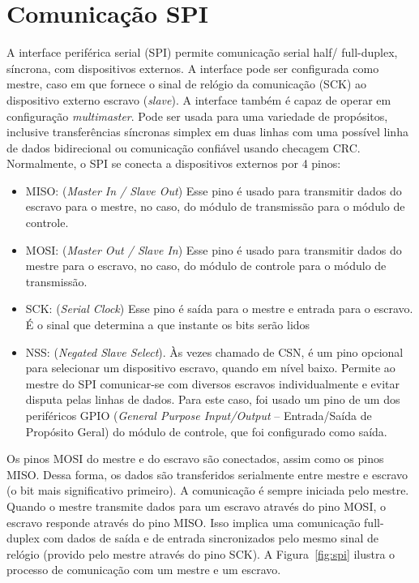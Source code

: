 \chapter{Comunicação SPI}\label{cap:com_spi}

A interface periférica serial (SPI) permite comunicação serial half/ full-duplex, síncrona, com dispositivos externos. A interface pode ser configurada como mestre, caso em que fornece o sinal de relógio da comunicação (SCK) ao dispositivo externo escravo (\textit{slave}). A 
interface também é capaz de operar em configuração \textit{multimaster}.
Pode ser usada para uma variedade de propósitos, inclusive transferências síncronas simplex em duas linhas com uma possível linha de dados bidirecional ou comunicação confiável usando checagem CRC.
Normalmente, o SPI se conecta a dispositivos externos por 4 pinos:
\begin{itemize}
\item MISO: (\textit{Master In / Slave Out}) Esse pino é usado para transmitir dados do escravo para o mestre, no caso, do módulo de transmissão para o módulo de controle.
\item MOSI: (\textit{Master Out / Slave In}) Esse pino é usado para transmitir dados do mestre para o escravo, no caso, do módulo de controle para o módulo de transmissão.
\item SCK: (\textit{Serial Clock}) Esse pino é saída para o mestre e entrada para o escravo. É o sinal que determina a que instante os bits serão lidos
\item NSS: (\textit{Negated Slave Select}). Às vezes chamado de CSN, é um pino opcional para selecionar um dispositivo escravo, quando em nível baixo. Permite ao mestre do SPI comunicar-se com diversos escravos individualmente e evitar disputa pelas linhas de dados. Para este caso, foi usado um pino de um dos periféricos GPIO (\textit{General Purpose Input/Output} – Entrada/Saída de Propósito Geral) do módulo de controle, que foi configurado como saída.
\end{itemize}

Os pinos MOSI do mestre e do escravo são conectados, assim como os pinos MISO. Dessa forma, os dados são transferidos serialmente entre mestre e escravo (o bit mais significativo primeiro).
A comunicação é sempre iniciada pelo mestre. Quando o mestre transmite dados para um escravo através do pino MOSI, o escravo responde através do pino MISO. Isso implica uma comunicação full-duplex com dados de saída e de entrada sincronizados pelo mesmo sinal de relógio (provido pelo mestre através do pino SCK).
A Figura~\ref{fig:spi} ilustra o processo de comunicação com um mestre e um escravo.

